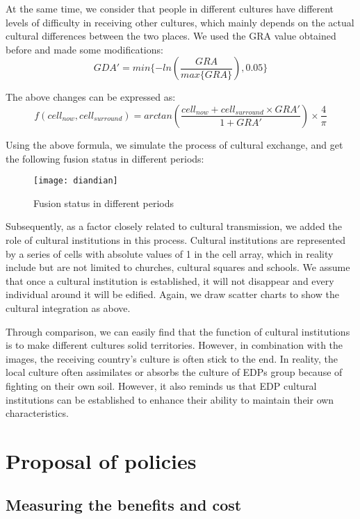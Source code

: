 \documentclass{mcmthesis}
\begin{document}
At the same time, we consider that people in different cultures have different levels of difficulty in receiving other cultures, which mainly depends on the actual cultural differences between the two places. We used the GRA value obtained before and made some modifications:
\begin{equation}
	GDA'=min\{-ln(\dfrac{GRA}{max\{GRA\}}),0.05\}
\end{equation}

 The above changes can be expressed as:
\begin{equation}
f(cell_{now},cell_{surround})=arctan(\dfrac{cell_{now}+cell_{surround}{\times}GRA'}{1+GRA'}){\times}\frac{4}{\pi}
\end{equation}

Using the above formula, we simulate the process of cultural exchange, and get the following fusion status in different periods:

\begin{figure}[h]%
	\small
	\centering
	\texttt{[image: diandian]}%
	\caption{Fusion status in different periods}
\end{figure}

Subsequently, as a factor closely related to cultural transmission, we added the role of cultural institutions in this process. Cultural institutions are represented by a series of cells with absolute values of 1 in the cell array, which in reality include but are not limited to churches, cultural squares and schools. We assume that once a cultural institution is established, it will not disappear and every individual around it will be edified. Again, we draw scatter charts to show the cultural integration as above.

Through comparison, we can easily find that the function of cultural institutions is to make different cultures solid territories. However, in combination with the images, the receiving country’s culture is often stick to the end. In reality, the local culture often assimilates or absorbs the culture of EDPs group because of fighting on their own soil. However, it also reminds us that EDP cultural institutions can be established to enhance their ability to maintain their own characteristics.

\section{Proposal of policies} 
\subsection{Measuring the benefits and cost}
\end{document}
